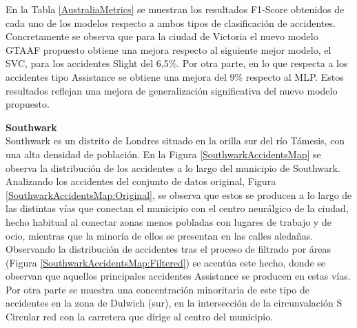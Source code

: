 \documentclass{uathesis-es}
\begin{document}
{En la Tabla \ref{AustraliaMetrics} se muestran los resultados F1-Score obtenidos de cada uno de los modelos respecto a ambos tipos de clasificación de accidentes. Concretamente se observa que para la ciudad de Victoria el nuevo modelo GTAAF propuesto obtiene una mejora respecto al siguiente mejor modelo, el SVC, para los accidentes Slight del 6,5\%. Por otra parte, en lo que respecta a los accidentes tipo Assistance se obtiene una mejora del 9\% respecto al MLP. Estos resultados reflejan una mejora de generalización significativa del nuevo modelo propuesto.



\textbf{Southwark}\\

Southwark es un distrito de Londres situado en la orilla sur del río Támesis, con una alta densidad de población. En la Figura \ref{SouthwarkAccidentsMap} se observa la distribución de los accidentes a lo largo del municipio de Southwark. Analizando los accidentes del conjunto de datos original, Figura \ref{SouthwarkAccidentsMap:Original}, se observa que estos se producen a lo largo de las distintas vías que conectan el municipio con el centro neurálgico de la ciudad, hecho habitual al conectar zonas menos pobladas con lugares de trabajo y de ocio, mientras que la minoría de ellos se presentan en las calles aledañas. Observando la distribución de accidentes tras el proceso de filtrado por áreas (Figura \ref{SouthwarkAccidentsMap:Filtered}) se acentúa este hecho, donde se observan que aquellos principales accidentes Assistance se producen en estas vías. Por otra parte se muestra una concentración minoritaria de este tipo de accidentes en la zona de Dulwich (sur), en la intersección de la circunvalación S Circular red con la carretera que dirige al centro del municipio.


}
\end{document}
